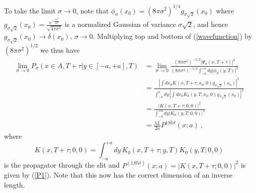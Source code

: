 \documentclass[12pt]{article}   %
\begin{document}
To take the limit $\sigma \to 0$, note that $\phi_\sigma(x_0) =
(8\pi\sigma^2)^{1/4}g_{\sigma\sqrt{2}}(x_0)$ where
$g_{\sigma\sqrt{2}}(x_0)=\frac{e^{-\frac{x_0^{'2}}{4\sigma^2}}}{\sqrt{4\pi\sigma^2}}$
is a normalized Gaussian of variance $\sigma\sqrt{2}$, and hence
$g_{\sigma\sqrt{2}}(x_0) \rightarrow \delta(x_0),\
\sigma\rightarrow0$. Multiplying top and bottom of
(\ref{wavefunction}) by $(8\pi \sigma^2)^{1/2}$ we thus have
\begin{align}
\lim_{\sigma\rightarrow 0}P_\sigma\left(x\in A,T+\tau|y\in
[-a,+a],T\right) &= \lim_{\sigma\rightarrow 0}
\frac{(8\pi\sigma^2)^{-1/2}
|\Psi_\sigma(x,T+\tau)|^2}{(8\pi\sigma^2)^{-1/2}\int_{-a}^{+a}dy
|\phi_\sigma(y,T)|^2} {}\nonumber\\ &= \frac{\left| \int dx_0
K(x,T+\tau; x_0,0) g_{\sigma \sqrt{2}}(x_0) \right|^2}{\int_{-a}^a
dy\, \left| \int dx_0 K_0(y,T;x_0,0) g_{\sigma \sqrt{2}} (x_0)
\right|^2} {}\nonumber\\ &= \frac{
|K(x,T+\tau;0,0)|^2}{\int_{-a}^{+a} dy |K_0(y,T;0,0)|^2}
{}\nonumber\\{}&=\frac{\lambda L}{2a}  P^{1 Slit}(x;a)\ ,
\end{align}
where \begin{equation} \label{propagator} K(x,T+\tau;0,0) =
\int_{-a}^{+a} dy\, K_0(x,T+\tau;y,T) K_0(y,T;0,0) \end{equation}
is the propagator through the slit and $P^{(1 Slit)}(x;a) =
|K(x,T+\tau;0,0)|^2$ is given by (\ref{P1}). Note that this now
has the correct dimension of an inverse length.
\end{document}
